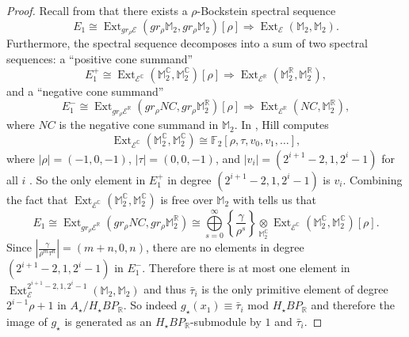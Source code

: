 \documentclass{amsart}
\theoremstyle{plain}
\numberwithin{equation}{section}
\numberwithin{figure}{section}
\DeclareMathOperator{\Ext}{Ext}
\newcommand{\mC}{{\mathbb C}}
\newcommand{\mF}{{\mathbb F}}
\newcommand{\mM}{{\mathbb M}}
\newcommand{\mR}{{\mathbb R}}
\newcommand{\cE}{{\mathcal E}}
\newcommand{\0}{\langle 0 \rangle }
\begin{document}
\begin{proof}
Recall from \cite[Prop~3.1,Rmk~3.3]{GuillouHillIsaksenRavenel2020} that there exists a $\rho$-Bockstein spectral sequence
\[ E_{1} \cong \Ext_{gr_{\rho}\cE}(gr_{\rho}\mM_{2}, gr_{\rho}\mM_{2})[\rho] \Longrightarrow \Ext_{\cE}(\mM_{2},\mM_{2}) .\]
Furthermore, the spectral sequence decomposes into a sum of two spectral sequences: a ``positive cone summand''
\[ E_{1}^{+} \cong \Ext_{\cE^{\mC}}(\mM_{2}^{\mC},\mM_{2}^{\mC})[\rho]\Longrightarrow  \Ext_{\cE^{\mR}}(\mM_{2}^{\mR},\mM_{2}^{\mR}),\]
and a ``negative cone summand''
\[ E_{1}^{-} \cong \Ext_{gr_{\rho}\cE^{\mR}}(gr_{\rho}NC,gr_{\rho}\mM_{2}^{\mR})[\rho]\Longrightarrow  \Ext_{\cE^{\mR}}(NC,\mM_{2}^{\mR}),\]
where $NC$ is the negative cone summand in $\mM_{2}$. 
In \cite{Hill11}, Hill computes 
\[
\Ext_{\cE^{\mC}}(\mM_{2}^{\mC},\mM_{2}^{\mC}) \cong \mF_{2}[\rho, \tau, v_{0}, v_{1}, \ldots],
\]
where $|\rho| = (-1,0,-1)$, $|\tau| = (0,0,-1)$, and $|v_{i}| = (2^{i+1} - 2, 1, 2^{i}-1)$ for all $i$ \cite[Thm~3.1]{Hill11}. So the only element in $E_{1}^{+}$ in degree $(2^{i+1}-2,1,2^{i}-1)$ is $v_{i}$. Combining the fact that $\Ext_{\cE^{\mC}}(\mM_{2}^{\mC},\mM_{2}^{\mC})$ is free over $\mM_2$ with \cite[Prop~3.1,Rmk~3.3]{GuillouHillIsaksenRavenel2020} tells us that
\[ 
E_{1} \cong \Ext_{gr_{\rho}\cE^{\mR}}(gr_{\rho}NC,gr_{\rho}\mM_{2}^{\mR}) \cong \bigoplus\limits_{s=0}^{\infty}\left\{\frac{\gamma}{\rho^{s}}\right\} \underset{\mM_{2}^{\mathbb{C}}}{\otimes}\Ext_{\cE^{\mC}}(\mM_{2}^{\mC},\mM_{2}^{\mC})[\rho]  .\]
Since $|\frac{\gamma}{\rho^{m}\tau^{n}}| = (m+n,0,n)$, there are no elements in degree $(2^{i+1} - 2, 1, 2^{i}-1)$ in $E_{1}^{-}$. Therefore there is at most one element in $\Ext_{\cE}^{2^{i+1} - 2, 1, 2^{i}-1}(\mM_{2},\mM_{2})$ and thus $\bar{\tau}_{i}$ is the only primitive element of degree $2^{i-1}\rho + 1$ in $A_{\star}/H_{\star}BP_{\mR}$. So indeed $g_{\star}(x_{1}) \equiv \bar{\tau}_{i}$ mod $H_{\star}BP_{\mR}$ and therefore the image of $g_{\star}$ is generated as an $H_{\star}BP_{\mR}$-submodule by $1$ and $\bar{\tau}_{i}$.

\end{proof}
\end{document}
